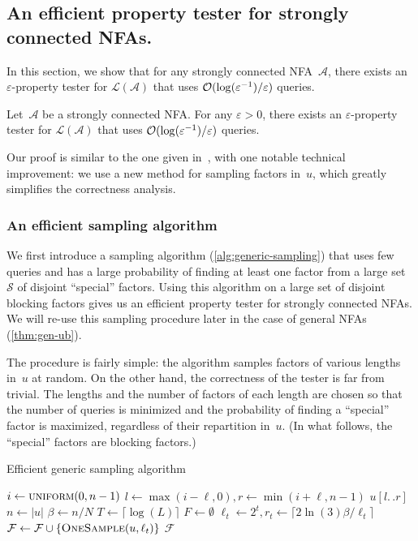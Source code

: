 \documentclass[letterpaper, USenglish, cleveref, autoref, thm-restate, numberwithinsect]{lipics-v2021}
\theoremstyle{theorem}
\theoremstyle{definition}
\newcommand{\Aa}{\mathcal{A}}
\newcommand{\cO}{\mathcal{O}}
\newcommand{\dd}{.\,.}
\newcommand{\eps}{\varepsilon}
\newcommand{\Ff}{\mathcal{F}}
\newcommand{\lang}[1]{\mathcal{L}(#1)}
\newcommand{\Ss}{\mathcal{S}}
\newcommand{\epslogeps}[1][]
{\ifthenelse{\equal{#1}{}}{\log(\eps^{-1})/\eps}{\log^{ #1 }(\eps^{-1})/\eps}}
\begin{document}
\subsection{An efficient property tester for strongly connected NFAs.}\label{sec:scc-ub}
In this section, we show that for any strongly connected NFA~$\Aa$, there exists an $\eps$-property tester for $\lang{\Aa}$ that uses $\cO(\epslogeps)$ queries.
\begin{theorem}\label{thm:generic-tester-scc}
    Let~$\Aa$ be a strongly connected NFA.
    For any $\eps > 0$, there exists an $\eps$-property tester for $\lang{\Aa}$
    that uses $\cO(\epslogeps)$ queries. 
\end{theorem}

Our proof is similar to the one given in~\cite{bathie2021property}, with one notable technical improvement: we use a new method for sampling factors in~$u$, which greatly simplifies the correctness analysis.

\subsubsection{An efficient sampling algorithm}

We first introduce a sampling algorithm (\cref{alg:generic-sampling}) that uses few queries and has a large probability of finding at least one factor from a large set $\Ss$ of disjoint ``special'' factors.
Using this algorithm on a large set of disjoint blocking factors gives us an efficient property tester for strongly connected NFAs. We will re-use this sampling procedure later in the case of general NFAs (\cref{thm:gen-ub}).  

The procedure is fairly simple: the algorithm samples factors of various lengths in~$u$ at random.
On the other hand, the correctness of the tester is far from trivial.
The lengths and the number of factors of each length are chosen so that the number of queries is minimized and the probability of finding a ``special'' factor is maximized, regardless of their repartition in~$u$. (In what follows, the ``special'' factors are blocking factors.)

\begin{algorithm}[htbp]
\caption{Efficient generic sampling algorithm}\label{alg:generic-sampling}
\begin{algorithmic}[1] 
    \State $i\gets \Call{uniform}{0, n-1}$
    \State $l\gets \max(i-\ell, 0), r\gets\min(i+\ell, n-1)$
    \State \Return $u[l\dd  r]$
\EndFunction
{}
\State $n \gets |u|$
\State $\beta \gets n/N$
\State $T \gets \lceil\log(L)\rceil$
\State $F \gets \emptyset$
    \State $\ell_t \gets 2^t, r_t \gets \lceil 2\ln(3)\beta/\ell_t \rceil$
        \State $\Ff \gets \Ff \cup \{\Call{OneSample}{u, \ell_t}\}$
    \EndFor
\EndFor
\State \Return $\Ff$
\EndFunction
\end{algorithmic}
\end{algorithm}
\end{document}
